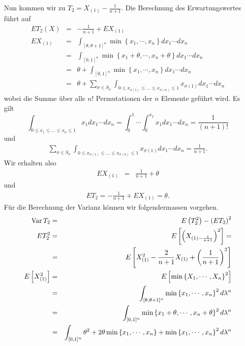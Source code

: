 Nun kommen wir zu $T_2 = X_{(1)}-\frac{1}{n+1}$. Die Berechnung des Erwartungswertes führt auf
\begin{eqnarray}
	E T_2(X) &=&  -\frac{1}{n+1} + E X_{(1)} \\
	E X_{(1)} &=& \int_{[\theta,\theta+1]^n}^{} \min\left\{ x_1,\cdots,x_n \right\} dx_1\cdots d x_n \\
	&=& \int_{[0,1]^n}^{} \min\left\{ x_1+\theta,\cdots,x_n+\theta \right\} dx_1\cdots d x_n \\
	&=& \theta + \int_{[0,1]^n}^{} \min\left\{ x_1,\cdots,x_n \right\} dx_1\cdots d x_n \\
	&=& \theta +\sum_{\sigma\in S_n}^{} \int_{0\leq x_{\sigma(1)}\leq \ldots \leq x_{\sigma(n)}\leq 1} x_{\sigma(1)} dx_1 \cdots dx_n 
	\label{}
\end{eqnarray}
wobei die Summe über alle $n!$ Permutationen der $n$ Elemente geführt wird.
Es gilt
\begin{equation}
	\int_{0\leq x_1\leq \ldots\leq x_n\leq 1} x_1 dx_1 \cdots d x_n = 
	\int_{0}^{1}\cdots \int_{0}^{x_2} x_1 dx_1 \cdots dx_n = 
	\frac{1}{\left( n+1 \right)!}
\end{equation}
und
\begin{eqnarray}
	\sum_{\sigma\in S_n}^{} \int_{0\leq x_{\sigma(1)}\leq \ldots \leq x_{\sigma(n)}\leq 1} x_{\sigma(1)} dx_1 \cdots dx_n 
	=\frac{1}{n+1}.
\end{eqnarray}
Wir erhalten also
\begin{eqnarray}
	E X_{(1)} &=& \frac{1}{n+1} + \theta
\end{eqnarray}
und 
\begin{eqnarray}
	E T_2 = -\frac{1}{n+1} + E X_{(1)} = \theta.
\end{eqnarray}
Für die Berechnung der Varianz können wir folgendermassen vorgehen. 
\begin{eqnarray}
	\operatorname{Var} T_2 &=& E \left( T_2^2 \right) - \left( E T_2 \right)^2 \\
	E T_2^2 &=& E \left[ \left( X_{(1) - \frac{1}{n+1}} \right)^2 \right] = \\
	&=& E \left[ X_{(1)}^2 - \frac{2}{n+1}X_{(1)}+ \left( \frac{1}{n+1} \right)^2 \right] \\
	E\left[  X_{(1)}^2 \right] &=&  E \left[ \min\left\{ X_1,\cdots,X_n \right\}^2 \right] \\
	&=& \int_{[\theta,\theta+1]^n}^{} \min\left\{ x_1,\cdots,x_n \right\}^2 d \lambda^n \\
	&=& \int_{[0,1]^n}^{} \min\left\{ x_1+ \theta,\cdots,x_n+ \theta \right\}^2 d \lambda^n \\
	&=& \int_{[0,1]^n}^{} \theta^2 +2\theta\min\left\{ x_1,\cdots,x_n \right\}+ \min\left\{ x_1,\cdots,x_n \right\}^2 d\lambda^n\\
\end{eqnarray}
